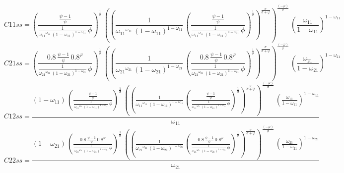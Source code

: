 \begin{dmath*}
C11ss = \left(\frac{\frac{{{\psi}}-1}{{{\psi}}}}{\frac{1}{{{\omega_{11}}}^{{{\omega_{11}}}}\, \left(1-{{\omega_{11}}}\right)^{1-{{\omega_{11}}}}}\, {{\phi}}}\right)^{\frac{1}{{{\sigma}}}}\, \left(\left(\frac{1}{{{\omega_{11}}}^{{{\omega_{11}}}}\, \left(1-{{\omega_{11}}}\right)^{1-{{\omega_{11}}}}}\, \left(\frac{\frac{{{\psi}}-1}{{{\psi}}}}{\frac{1}{{{\omega_{11}}}^{{{\omega_{11}}}}\, \left(1-{{\omega_{11}}}\right)^{1-{{\omega_{11}}}}}\, {{\phi}}}\right)^{\frac{1}{{{\sigma}}}}\right)^{\frac{{{\sigma}}}{{{\sigma}}+{{\varphi}}}}\right)^{\frac{\left(-{{\varphi}}\right)}{{{\sigma}}}}\, \left(\frac{{{\omega_{11}}}}{1-{{\omega_{11}}}}\right)^{1-{{\omega_{11}}}}
\end{dmath*}
\begin{dmath*}
C21ss = \left(\frac{0.8\, \frac{{{\psi}}-1}{{{\psi}}}\, 0.8^{{{\varphi}}}}{\frac{1}{{{\omega_{21}}}^{{{\omega_{21}}}}\, \left(1-{{\omega_{21}}}\right)^{1-{{\omega_{21}}}}}\, {{\phi}}}\right)^{\frac{1}{{{\sigma}}}}\, \left(\left(\frac{1}{{{\omega_{21}}}^{{{\omega_{21}}}}\, \left(1-{{\omega_{21}}}\right)^{1-{{\omega_{21}}}}}\, \left(\frac{0.8\, \frac{{{\psi}}-1}{{{\psi}}}\, 0.8^{{{\varphi}}}}{\frac{1}{{{\omega_{21}}}^{{{\omega_{21}}}}\, \left(1-{{\omega_{21}}}\right)^{1-{{\omega_{21}}}}}\, {{\phi}}}\right)^{\frac{1}{{{\sigma}}}}\right)^{\frac{{{\sigma}}}{{{\sigma}}+{{\varphi}}}}\right)^{\frac{\left(-{{\varphi}}\right)}{{{\sigma}}}}\, \left(\frac{{{\omega_{21}}}}{1-{{\omega_{21}}}}\right)^{1-{{\omega_{21}}}}
\end{dmath*}
\begin{dmath*}
C12ss = \frac{\left(1-{{\omega_{11}}}\right)\, \left(\frac{\frac{{{\psi}}-1}{{{\psi}}}}{\frac{1}{{{\omega_{11}}}^{{{\omega_{11}}}}\, \left(1-{{\omega_{11}}}\right)^{1-{{\omega_{11}}}}}\, {{\phi}}}\right)^{\frac{1}{{{\sigma}}}}\, \left(\left(\frac{1}{{{\omega_{11}}}^{{{\omega_{11}}}}\, \left(1-{{\omega_{11}}}\right)^{1-{{\omega_{11}}}}}\, \left(\frac{\frac{{{\psi}}-1}{{{\psi}}}}{\frac{1}{{{\omega_{11}}}^{{{\omega_{11}}}}\, \left(1-{{\omega_{11}}}\right)^{1-{{\omega_{11}}}}}\, {{\phi}}}\right)^{\frac{1}{{{\sigma}}}}\right)^{\frac{{{\sigma}}}{{{\sigma}}+{{\varphi}}}}\right)^{\frac{\left(-{{\varphi}}\right)}{{{\sigma}}}}\, \left(\frac{{{\omega_{11}}}}{1-{{\omega_{11}}}}\right)^{1-{{\omega_{11}}}}}{{{\omega_{11}}}}
\end{dmath*}
\begin{dmath*}
C22ss = \frac{\left(1-{{\omega_{21}}}\right)\, \left(\frac{0.8\, \frac{{{\psi}}-1}{{{\psi}}}\, 0.8^{{{\varphi}}}}{\frac{1}{{{\omega_{21}}}^{{{\omega_{21}}}}\, \left(1-{{\omega_{21}}}\right)^{1-{{\omega_{21}}}}}\, {{\phi}}}\right)^{\frac{1}{{{\sigma}}}}\, \left(\left(\frac{1}{{{\omega_{21}}}^{{{\omega_{21}}}}\, \left(1-{{\omega_{21}}}\right)^{1-{{\omega_{21}}}}}\, \left(\frac{0.8\, \frac{{{\psi}}-1}{{{\psi}}}\, 0.8^{{{\varphi}}}}{\frac{1}{{{\omega_{21}}}^{{{\omega_{21}}}}\, \left(1-{{\omega_{21}}}\right)^{1-{{\omega_{21}}}}}\, {{\phi}}}\right)^{\frac{1}{{{\sigma}}}}\right)^{\frac{{{\sigma}}}{{{\sigma}}+{{\varphi}}}}\right)^{\frac{\left(-{{\varphi}}\right)}{{{\sigma}}}}\, \left(\frac{{{\omega_{21}}}}{1-{{\omega_{21}}}}\right)^{1-{{\omega_{21}}}}}{{{\omega_{21}}}}
\end{dmath*}
